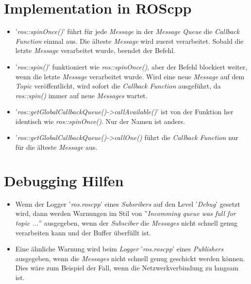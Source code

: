 \section{Implementation in ROScpp}
\begin{itemize}
\item '\textit{ros::spinOnce()}' führt für jede \textit{Message} in der \textit{Message Queue} die \textit{Callback Function} einmal aus. Die älteste \textit{Message} wird zuerst verarbeitet. Sobald die letzte \textit{Message} verarbeitet wurde, beendet der Befehl.
\item '\textit{ros::spin()}' funktioniert wie \textit{ros::spinOnce()}, aber der Befehl blockiert weiter, wenn die letzte \textit{Message} verarbeitet wurde. Wird eine neue \textit{Message} auf dem \textit{Topic} veröffentlicht, wird sofort die \textit{Callback Function} ausgeführt, da \textit{ros::spin()} immer auf neue \textit{Messages} wartet.
\item '\textit{ros::getGlobalCallbackQueue()->callAvailable()}' ist von der Funktion her identisch wie \textit{ros::spinOnce()}. Nur der Namen ist anders.
\item '\textit{ros::getGlobalCallbackQueue()->callOne()} führt die \textit{Callback Function} nur für die älteste \textit{Message} aus.
\end{itemize}


\section{Debugging Hilfen}
\begin{itemize}
\item Wenn der Logger '\textit{ros.roscpp}' eines \textit{Subsribers} auf den Level '\textit{Debug}' gesetzt wird, dann werden Warnungen im Stil von ''\textit{Incomming queue was full for topic ...}'' ausgegeben, wenn der \textit{Subsciber} die \textit{Messages} nicht schnell genug verarbeiten kann und der Buffer überfüllt ist.
\item Eine ähnliche Warnung wird beim \textit{Logger} '\textit{ros.roscpp}' eines \textit{Publishers} ausgegeben, wenn die \textit{Messages} nicht schnell genug geschickt werden können. Dies wäre zum Beispiel der Fall, wenn die Netzwerkverbindung zu langsam ist.
\end{itemize}